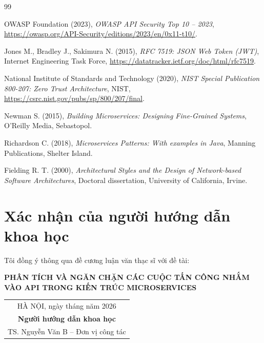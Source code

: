 \documentclass[14pt,a4paper]{extarticle}
\newcommand{\supervisorone}{TS. Nguyễn Văn B -- Đơn vị công tác}
\newcommand{\city}{HÀ NỘI}
\newcommand{\yearnumber}{2026}
\newcommand{\thesistitle}{PHÂN TÍCH VÀ NGĂN CHẶN CÁC CUỘC TẤN CÔNG NHẮM VÀO API TRONG KIẾN TRÚC MICROSERVICES}
\begin{document}
\begin{thebibliography}{99}

OWASP Foundation (2023), \textit{OWASP API Security Top 10 -- 2023}, \url{https://owasp.org/API-Security/editions/2023/en/0x11-t10/}.

Jones M., Bradley J., Sakimura N. (2015), \textit{RFC 7519: JSON Web Token (JWT)}, Internet Engineering Task Force, \url{https://datatracker.ietf.org/doc/html/rfc7519}.

National Institute of Standards and Technology (2020), \textit{NIST Special Publication 800-207: Zero Trust Architecture}, NIST, \url{https://csrc.nist.gov/pubs/sp/800/207/final}.

Newman S. (2015), \textit{Building Microservices: Designing Fine-Grained Systems}, O'Reilly Media, Sebastopol.

Richardson C. (2018), \textit{Microservices Patterns: With examples in Java}, Manning Publications, Shelter Island.

Fielding R. T. (2000), \textit{Architectural Styles and the Design of Network-based Software Architectures}, Doctoral dissertation, University of California, Irvine.

\end{thebibliography}

\newpage
\section*{Xác nhận của người hướng dẫn khoa học}

\vspace{1cm}
\noindent Tôi đồng ý thông qua đề cương luận văn thạc sĩ với đề tài:

\begin{center}
{\bfseries \MakeUppercase{\thesistitle}}
\end{center}

\vspace{2cm}
\begin{flushright}
\begin{tabular}{c}
\city, ngày \hspace{1cm} tháng \hspace{1cm} năm \yearnumber\\[0.4cm]
\textbf{Người hướng dẫn khoa học}\\[2.5cm]
\supervisorone
\end{tabular}
\end{flushright}
\end{document}
